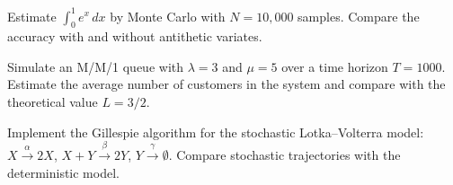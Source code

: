 \begin{exercise}
Estimate $\int_0^1 e^x\,dx$ by Monte Carlo with $N = 10{,}000$ samples.
Compare the accuracy with and without antithetic variates.
\end{exercise}

\begin{exercise}
Simulate an M/M/1 queue with $\lambda = 3$ and $\mu = 5$ over a time
horizon $T = 1000$. Estimate the average number of customers in the
system and compare with the theoretical value $L = 3/2$.
\end{exercise}

\begin{exercise}
Implement the Gillespie algorithm for the stochastic Lotka--Volterra
model: $X \xrightarrow{\alpha} 2X$, $X + Y \xrightarrow{\beta} 2Y$,
$Y \xrightarrow{\gamma} \emptyset$. Compare stochastic trajectories
with the deterministic model.
\end{exercise}
